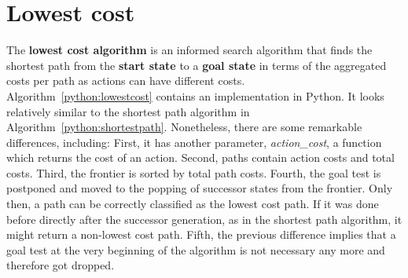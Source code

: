 \documentclass{report}
\begin{document}
\section{Lowest cost}
The {\bf lowest cost algorithm} is an informed search algorithm that finds the shortest path from the {\bf start state} to a {\bf goal state} in terms of the aggregated costs per path as actions can have different costs.
\\
Algorithm~\ref{python:lowestcost} contains an implementation in Python. It looks relatively similar to the shortest path algorithm in Algorithm~\ref{python:shortestpath}.
Nonetheless, there are some remarkable differences, including:
First, it has another parameter, {\em action\_cost}, a function which returns the cost of an action.
Second, paths contain action costs and total costs.
Third, the frontier is sorted by total path costs.
Fourth, the goal test is postponed and moved to the popping of successor states from the frontier. Only then, a path can be correctly classified as the lowest cost path. If it was done before directly after the successor generation, as in the shortest path algorithm, it might return a non-lowest cost path.
Fifth, the previous difference implies that a goal test at the very beginning of the algorithm is not necessary any more and therefore got dropped.
\end{document}
